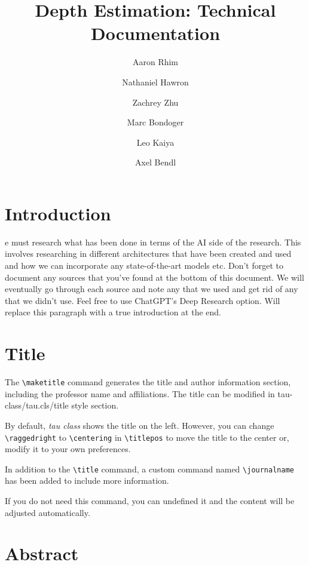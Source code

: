 \documentclass[9pt,a4paper,twocolumn,twoside]{tau-class/tau}
\title{Depth Estimation: Technical Documentation}
\author[a,1]{Aaron Rhim}
\author[b,2]{Nathaniel Hawron}
\author[c,3]{Zachrey Zhu}
\author[d,4]{Marc Bondoger}
\author[e,5]{Leo Kaiya}
\author[f,6]{Axel Bendl}
\affil[a, b, c, d, e, f]{University of British Columbia}
\begin{document}
		
    \maketitle 
    \thispagestyle{firststyle} 
    \tauabstract 
    

\section{Introduction}

    e must research what has been done in terms of the AI side of the research. This involves researching in different architectures 
    that have been created and used and how we can incorporate any state-of-the-art models etc. Don't forget to document any
    sources that you've found at the bottom of this document. We will eventually go through each source and note any that we used
    and get rid of any that we didn't use. Feel free to use ChatGPT's Deep Research option. Will replace this 
    paragraph with a true introduction at the end.

\section{Title}

    The \verb*|\maketitle| command generates the title and author information section, including the professor name and affiliations. The title can be modified in tau-class/tau.cls/title style section. 
	
    By default, \textit{tau class} shows the title on the left. However, you can change \verb*|\raggedright| to \verb*|\centering| in \verb*|\titlepos| to move the title to the center or, modify it to your own preferences.
	
    In addition to the \verb|\title| command, a custom command named \verb|\journalname| has been added to include more information. 
	
    If you do not need this command, you can undefined it and the content will be adjusted automatically.
	
\section{Abstract}
\end{document}

